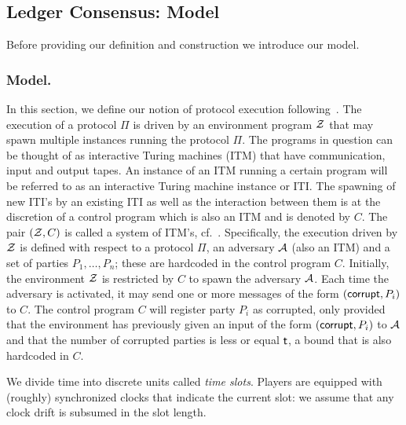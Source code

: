 \subsection{Ledger Consensus: Model}
Before providing our definition and construction we introduce our model.

\subsubsection{Model.}

In this section, we define our notion of protocol execution following~\cite{DBLP:conf/eurocrypt/GarayKL15,DBLP:conf/focs/Canetti01}.
The execution of a protocol $\Pi$ is driven by an
environment program $\mathcal{Z}$ that may spawn multiple instances running the protocol $\Pi$. The programs
in question can be thought of as interactive Turing machines (ITM) that have communication,
input and output tapes. An instance of an ITM running a certain program will be referred to as
an interactive Turing machine instance or ITI. The spawning of new ITI's by an existing ITI as
well as the interaction between them is at the discretion of a control program which is also an ITM
and is denoted by $C$. The pair $(\mathcal{Z}, C)$ is called a system of ITM's, cf.~\cite{DBLP:conf/focs/Canetti01}.
Specifically, the execution driven by $\mathcal{Z}$ is defined with respect to a protocol $\Pi$, an adversary $\mathcal{A}$
(also an ITM) and a set of parties $P_1,\dots,P_n$; these are hardcoded in the control program $C$.
Initially, the environment $\mathcal{Z}$ is restricted by $C$ to spawn the adversary $\mathcal{A}$. Each time the
adversary is activated, it may send one or more messages of the form $(\mathsf{corrupt}, P_i)$ to $C$. The control
program $C$ will register party $P_i$ as corrupted, only provided that the environment has previously
given an input of the form $(\mathsf{corrupt}, P_i)$ to $\mathcal{A}$ and that the number of corrupted parties is less or
equal $\mathsf{t}$, a bound that is also hardcoded in $C$.

We divide time into discrete units called \emph{time slots}. Players are equipped with (roughly)
synchronized clocks that indicate the current slot: we assume that any clock drift is subsumed in the slot
length.





